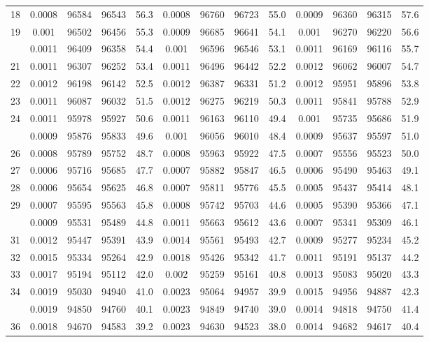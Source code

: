\documentclass[
  14pt,
]{article}
\begin{document}
\begin{longtable}[t]{lcccccccccccc}
18 & 0.0008 & 96584 & 96543 & 56.3 & 0.0008 & 96760 & 96723 & 55.0 & 0.0009 & 96360 & 96315 & 57.6\\
19 & 0.001 & 96502 & 96456 & 55.3 & 0.0009 & 96685 & 96641 & 54.1 & 0.001 & 96270 & 96220 & 56.6\\
\addlinespace
20 & 0.0011 & 96409 & 96358 & 54.4 & 0.001 & 96596 & 96546 & 53.1 & 0.0011 & 96169 & 96116 & 55.7\\
21 & 0.0011 & 96307 & 96252 & 53.4 & 0.0011 & 96496 & 96442 & 52.2 & 0.0012 & 96062 & 96007 & 54.7\\
22 & 0.0012 & 96198 & 96142 & 52.5 & 0.0012 & 96387 & 96331 & 51.2 & 0.0012 & 95951 & 95896 & 53.8\\
23 & 0.0011 & 96087 & 96032 & 51.5 & 0.0012 & 96275 & 96219 & 50.3 & 0.0011 & 95841 & 95788 & 52.9\\
24 & 0.0011 & 95978 & 95927 & 50.6 & 0.0011 & 96163 & 96110 & 49.4 & 0.001 & 95735 & 95686 & 51.9\\
\addlinespace
25 & 0.0009 & 95876 & 95833 & 49.6 & 0.001 & 96056 & 96010 & 48.4 & 0.0009 & 95637 & 95597 & 51.0\\
26 & 0.0008 & 95789 & 95752 & 48.7 & 0.0008 & 95963 & 95922 & 47.5 & 0.0007 & 95556 & 95523 & 50.0\\
27 & 0.0006 & 95716 & 95685 & 47.7 & 0.0007 & 95882 & 95847 & 46.5 & 0.0006 & 95490 & 95463 & 49.1\\
28 & 0.0006 & 95654 & 95625 & 46.8 & 0.0007 & 95811 & 95776 & 45.5 & 0.0005 & 95437 & 95414 & 48.1\\
29 & 0.0007 & 95595 & 95563 & 45.8 & 0.0008 & 95742 & 95703 & 44.6 & 0.0005 & 95390 & 95366 & 47.1\\
\addlinespace
30 & 0.0009 & 95531 & 95489 & 44.8 & 0.0011 & 95663 & 95612 & 43.6 & 0.0007 & 95341 & 95309 & 46.1\\
31 & 0.0012 & 95447 & 95391 & 43.9 & 0.0014 & 95561 & 95493 & 42.7 & 0.0009 & 95277 & 95234 & 45.2\\
32 & 0.0015 & 95334 & 95264 & 42.9 & 0.0018 & 95426 & 95342 & 41.7 & 0.0011 & 95191 & 95137 & 44.2\\
33 & 0.0017 & 95194 & 95112 & 42.0 & 0.002 & 95259 & 95161 & 40.8 & 0.0013 & 95083 & 95020 & 43.3\\
34 & 0.0019 & 95030 & 94940 & 41.0 & 0.0023 & 95064 & 94957 & 39.9 & 0.0015 & 94956 & 94887 & 42.3\\
\addlinespace
35 & 0.0019 & 94850 & 94760 & 40.1 & 0.0023 & 94849 & 94740 & 39.0 & 0.0014 & 94818 & 94750 & 41.4\\
36 & 0.0018 & 94670 & 94583 & 39.2 & 0.0023 & 94630 & 94523 & 38.0 & 0.0014 & 94682 & 94617 & 40.4\\

\end{longtable}
\end{document}

